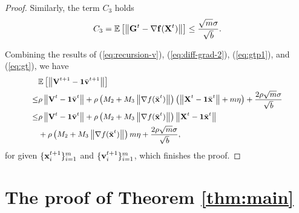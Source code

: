 \documentclass[sigconf]{acmart}
\newcommand{\Norm}[1]{\left\| #1 \right\|}
\def\vone{{\bf{1}}}
\def\vf{{\bf{f}}}
\def\vv{{\bf{v}}}
\def\vx{{\bf{x}}}
\def\BE{{\mathbb{E}}}
\def\mG {{\bf G}}
\def\mV {{\bf V}}
\def\mX {{\bf X}}
\theoremstyle{plain}
\def\bx{{\bar\vx}}
\def\bv{{\bar\vv}}
\begin{document}
\begin{proof}
Similarly, the term $C_3$ holds
\begin{align}\label{eq:gt}
  C_3 =  \BE\left[\Norm{\mG^{t} - \nabla \vf(\mX^{t})}\right] 
\leq \frac{\sqrt{m}\sigma}{\sqrt{b}}.
\end{align}

Combining the results of (\ref{eq:recursion-v}), (\ref{eq:diff-grad-2}), (\ref{eq:gtp1}), and (\ref{eq:gt}), we have
\begin{align*}\small
\begin{split} 
   & \BE\left[\Norm{\mV^{t+1} - \vone\bv^{t+1}}\right] \\
\leq & \rho\Norm{\mV^t - \vone\bv^t} + \rho\left(M_2 + M_3\Norm{\nabla f(\bx^{t})}\right) \left(\Norm{\mX^t - \vone\bx^t} + m\eta\right) + \frac{2\rho\sqrt{m}\sigma}{\sqrt{b}} \\
\leq & \rho\Norm{\mV^t - \vone\bv^t} + \rho\left(M_2 + M_3\Norm{\nabla f(\bx^{t})}\right)\Norm{\mX^t - \vone\bx^t} \\
& + \rho\left(M_2 + M_3\Norm{\nabla f(\bx^{t})}\right) m\eta + \frac{2\rho\sqrt{m}\sigma}{\sqrt{b}},
\end{split}
\end{align*}
for given $\{\vx_i^{t+1}\}_{i=1}^m$ and $\{\vv_i^{t+1}\}_{i=1}^m$, which finishes the proof.
\end{proof}

\section{The proof of Theorem \ref{thm:main}}
\end{document}
